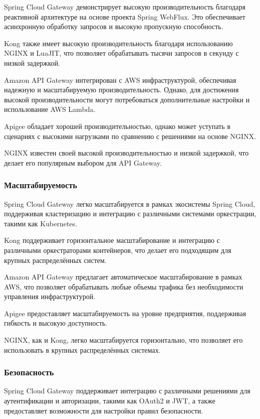Spring Cloud Gateway демонстрирует высокую производительность благодаря реактивной архитектуре на основе проекта Spring
WebFlux.
Это обеспечивает асинхронную обработку запросов и высокую пропускную способность.

Kong также имеет высокую производительность благодаря использованию NGINX и LuaJIT, что позволяет обрабатывать тысячи
запросов в секунду с низкой задержкой.

Amazon API Gateway интегрирован с AWS инфраструктурой, обеспечивая надежную и масштабируемую производительность.
Однако,
для достижения высокой производительности могут потребоваться дополнительные настройки и использование AWS Lambda.

Apigee обладает хорошей производительностью, однако может уступать в сценариях с высокими нагрузками по сравнению с
решениями на основе NGINX\@.

NGINX известен своей высокой производительностью и низкой задержкой, что делает его популярным выбором для API Gateway.

\subsubsection{Масштабируемость}

Spring Cloud Gateway легко масштабируется в рамках экосистемы Spring Cloud, поддерживая кластеризацию и интеграцию с
различными системами оркестрации, такими как Kubernetes.

Kong поддерживает горизонтальное масштабирование и интеграцию с различными оркестраторами контейнеров, что делает его
подходящим для крупных распределённых систем.

Amazon API Gateway предлагает автоматическое масштабирование в рамках AWS, что позволяет обрабатывать любые объемы
трафика без необходимости управления инфраструктурой.

Apigee предоставляет масштабируемость на уровне предприятия, поддерживая гибкость и высокую доступность.

NGINX, как и Kong, легко масштабируется горизонтально, что позволяет его использовать в крупных распределённых системах.

\subsubsection{Безопасность}

Spring Cloud Gateway поддерживает интеграцию с различными решениями для аутентификации и авторизации, такими как OAuth2
и JWT, а также предоставляет возможности для настройки правил безопасности.

